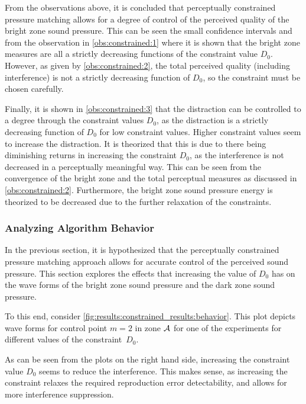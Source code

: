 From the observations above, it is concluded that perceptually constrained pressure matching allows
for a degree of control of the perceived quality of the bright zone sound pressure.
This can be seen the small confidence intervals and 
from the observation in \autoref{obs:constrained:1} where it is shown that the bright zone measures are 
all a strictly decreasing functions of the constraint value $D_0$. 
However, as given by \autoref{obs:constrained:2}, the total perceived quality (including interference) is 
not a strictly decreasing function of $D_0$, so the constraint must be chosen carefully.

Finally, it is shown in \autoref{obs:constrained:3} that the distraction can be controlled to a degree through 
the constraint values $D_0$, as the distraction is a strictly decreasing function of $D_0$ for low constraint values. 
Higher constraint values seem to increase the distraction.
It is theorized that this is due to there being diminishing returns in increasing the constraint $D_0$, as the 
interference is not decreased in a perceptually meaningful way.
This can be seen from the convergence of the bright zone and the total perceptual measures as discussed in 
\autoref{obs:constrained:2}.
Furthermore, the bright zone sound pressure energy is theorized to be decreased due to the further 
relaxation of the constraints.

\subsubsection*{Analyzing Algorithm Behavior}

In the previous section, it is hypothesized that the perceptually constrained pressure matching approach 
allows for accurate control of the perceived sound pressure.
This section explores the effects that increasing the value of $D_0$ has on the wave forms of the 
bright zone sound pressure and the dark zone sound pressure.

To this end, consider \autoref{fig:results:constrained_results:behavior}.
This plot depicts wave forms for control point $m=2$ in zone $\mathcal{A}$ for one of the experiments for different values 
of the constraint~$D_0$.

As can be seen from the plots on the right hand side,
increasing the constraint value $D_0$ seems to reduce the interference.
This makes sense, as increasing the constraint relaxes the required reproduction error detectability, and allows for more interference suppression.

